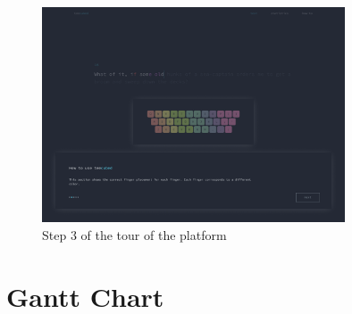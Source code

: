 \documentclass{report}
\begin{document}
\begin{figure}[H]
	\centering
	\includegraphics[width=0.8\textwidth]{frontend-guide-4.png}
	\caption{Step 3 of the tour of the platform}
	\centering
\end{figure}

\chapter{Gantt Chart}
\begin{landscape}
	
\end{landscape}

\newpage
\printbibliography[heading=bibintoc,title={References}]{}
\end{document}
